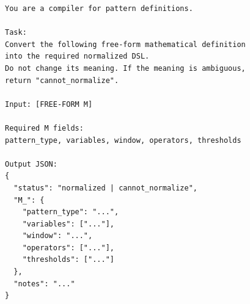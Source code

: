 \documentclass[sigconf,nonacm,anonymous]{acmart}
\begin{document}
\begin{figure}[h]
\begin{promptbox}\small
\begin{prompt}
\begin{verbatim}
You are a compiler for pattern definitions.

Task:
Convert the following free-form mathematical definition into the required normalized DSL.
Do not change its meaning. If the meaning is ambiguous, return "cannot_normalize".

Input: [FREE-FORM M]

Required M fields:
pattern_type, variables, window, operators, thresholds

Output JSON:
{
  "status": "normalized | cannot_normalize",
  "M_": {
    "pattern_type": "...",
    "variables": ["..."],
    "window": "...",
    "operators": ["..."],
    "thresholds": ["..."]
  },
  "notes": "..."
}
\end{verbatim}
\end{prompt}
\end{promptbox}
\end{figure}

\end{document}
